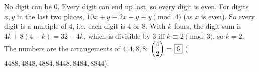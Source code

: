 No digit can be $0$. Every digit can end up last, so every digit is even. For digits $x,y$ in the last two places, $10x+y\equiv2x+y\equiv y\pmod4$ (as $x$ is even). So every digit is a multiple of $4$, i.e. each digit is $4$ or $8$. With $k$ fours, the digit sum is $4k+8(4-k)=32-4k$, which is divisible by $3$ iff $k\equiv2\pmod3$, so $k=2$. The numbers are the arrangements of $4,4,8,8$: $\dbinom42=\boxed{6}$ ($4488,4848,4884,8448,8484,8844$).
